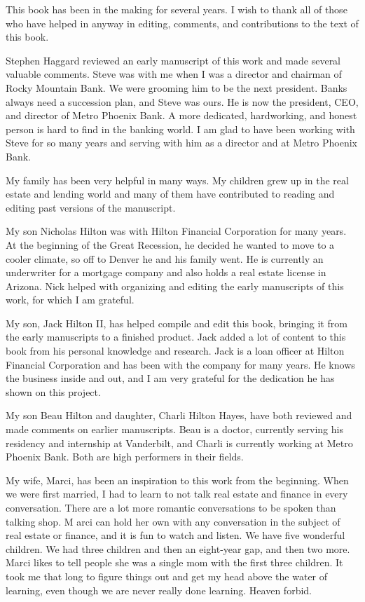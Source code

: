 \documentclass[
]{book}
\begin{document}
This book has been in the making for several years.
I wish to thank all of those who have helped in anyway in editing, comments, and contributions to the text of this book.

Stephen Haggard reviewed an early manuscript of this work and made several valuable comments.
Steve was with me when I was a director and chairman of Rocky Mountain Bank.
We were grooming him to be the next president.
Banks always need a succession plan, and Steve was ours.
He is now the president, CEO, and director of Metro Phoenix Bank.
A more dedicated, hardworking, and honest person is hard to find in the banking world.
I am glad to have been working with Steve for so many years and serving with him as a director and at Metro Phoenix Bank.

My family has been very helpful in many ways.
My children grew up in the real estate and lending world
and many of them have contributed to reading and editing past versions of the manuscript.

My son Nicholas Hilton was with Hilton Financial Corporation for many years.
At the beginning of the Great Recession,
he decided he wanted to move to a cooler climate,
so off to Denver he and his family went.
He is currently an underwriter for a mortgage company and also holds a real estate license in Arizona.
Nick helped with organizing and editing the early manuscripts of this work, for which I am grateful.

My son, Jack Hilton II, has helped compile and edit this book,
bringing it from the early manuscripts to a finished product.
Jack added a lot of content to this book from his personal knowledge and research.
Jack is a loan officer at Hilton Financial Corporation
and has been with the company for many years.
He knows the business inside and out,
and I am very grateful for the dedication he has shown on this project.

My son Beau Hilton and daughter, Charli Hilton Hayes,
have both reviewed and made comments on earlier manuscripts.
Beau is a doctor, currently serving his residency and internship at Vanderbilt,
and Charli is currently working at Metro Phoenix Bank.
Both are high performers in their fields.

My wife, Marci, has been an inspiration to this work from the beginning.
When we were first married, I had to learn to not talk real estate and finance in every conversation.
There are a lot more romantic conversations to be spoken than talking shop. M
arci can hold her own with any conversation in the subject of real estate or finance,
and it is fun to watch and listen.
We have five wonderful children.
We had three children and then an eight-year gap, and then two more.
Marci likes to tell people she was a single mom with the first three children.
It took me that long to figure things out and get my head above the water of learning,
even though we are never really done learning.
Heaven forbid.
\end{document}
